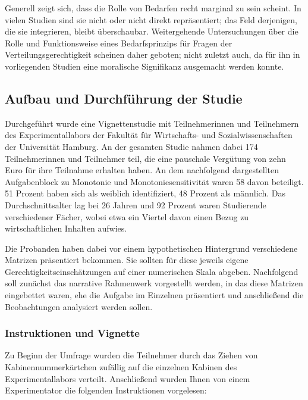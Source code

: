 \documentclass[a4paper]{thesis}
\begin{document}
Generell zeigt sich, dass die Rolle von Bedarfen recht marginal zu sein scheint. In vielen Studien sind sie nicht oder nicht direkt repräsentiert; das Feld derjenigen, die sie integrieren, bleibt überschaubar. Weitergehende Untersuchungen über die Rolle und Funktionsweise eines Bedarfsprinzips für Fragen der Verteilungsgerechtigkeit scheinen daher geboten; nicht zuletzt auch, da für ihn in vorliegenden Studien eine moralische Signifikanz ausgemacht werden konnte.

\subsection{Aufbau und Durchführung der Studie}
Durchgeführt wurde eine Vignettenstudie mit Teilnehmerinnen und Teilnehmern des Experimentallabors der Fakultät für Wirtschafts- und Sozialwissenschaften der Universität Hamburg. An der gesamten Studie nahmen dabei 174 Teilnehmerinnen und Teilnehmer teil,  die eine pauschale Vergütung von zehn Euro für ihre Teilnahme erhalten haben. An dem nachfolgend dargestellten Aufgabenblock zu Monotonie und Monotoniesensitivität waren 58 davon beteiligt. 51 Prozent haben sich als weiblich identifiziert, 48 Prozent als männlich. Das Durchschnittsalter lag bei 26 Jahren und 92 Prozent waren Studierende verschiedener Fächer, wobei etwa ein Viertel davon einen Bezug zu wirtschaftlichen Inhalten aufwies.

Die Probanden haben dabei vor einem hypothetischen Hintergrund verschiedene Matrizen präsentiert bekommen. Sie sollten für diese jeweils eigene Gerechtigkeitseinschätzungen auf einer numerischen Skala abgeben. Nachfolgend soll zunächst das narrative Rahmenwerk vorgestellt werden, in das diese Matrizen eingebettet waren, ehe die Aufgabe im Einzelnen präsentiert und anschließend die Beobachtungen analysiert werden sollen.

\subsubsection{Instruktionen und Vignette}
Zu Beginn der Umfrage wurden die Teilnehmer durch das Ziehen von Kabinennummerkärtchen zufällig auf die einzelnen Kabinen des Experimentallabors verteilt. Anschließend wurden Ihnen von einem Experimentator die folgenden Instruktionen vorgelesen:
\end{document}
